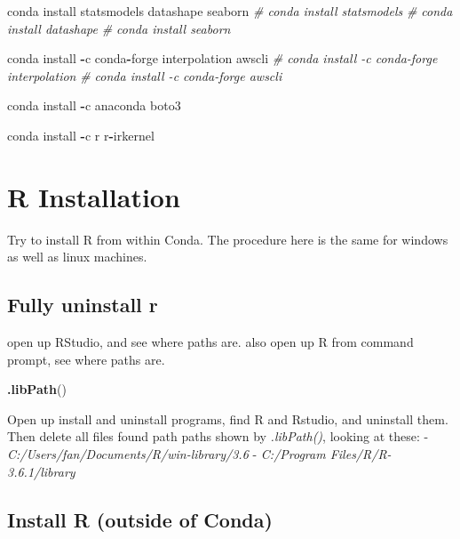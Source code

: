\documentclass[
]{article}
\newenvironment{Shaded}{\begin{snugshade}}{\end{snugshade}}
\newcommand{\CommentTok}[1]{\textcolor[rgb]{0.56,0.35,0.01}{\textit{#1}}}
\newcommand{\KeywordTok}[1]{\textcolor[rgb]{0.13,0.29,0.53}{\textbf{#1}}}
\newcommand{\NormalTok}[1]{#1}
\newcommand{\OperatorTok}[1]{\textcolor[rgb]{0.81,0.36,0.00}{\textbf{#1}}}
\begin{document}
\begin{Shaded}
\begin{Highlighting}[]
\NormalTok{conda install statsmodels datashape seaborn}
\CommentTok{# conda install statsmodels}
\CommentTok{# conda install datashape}
\CommentTok{# conda install seaborn}

\NormalTok{conda install }\OperatorTok{-}\NormalTok{c conda}\OperatorTok{-}\NormalTok{forge interpolation awscli}
\CommentTok{# conda install -c conda-forge interpolation}
\CommentTok{# conda install -c conda-forge awscli}

\NormalTok{conda install }\OperatorTok{-}\NormalTok{c anaconda boto3}

\NormalTok{conda install }\OperatorTok{-}\NormalTok{c r r}\OperatorTok{-}\NormalTok{irkernel}
\end{Highlighting}
\end{Shaded}

\hypertarget{r-installation}{%
\section{R Installation}\label{r-installation}}

Try to install R from within Conda. The procedure here is the same for
windows as well as linux machines.

\hypertarget{fully-uninstall-r}{%
\subsection{Fully uninstall r}\label{fully-uninstall-r}}

open up RStudio, and see where paths are. also open up R from command
prompt, see where paths are.

\begin{Shaded}
\begin{Highlighting}[]
\KeywordTok{.libPath}\NormalTok{()}
\end{Highlighting}
\end{Shaded}

Open up install and uninstall programs, find R and Rstudio, and
uninstall them. Then delete all files found path paths shown by
\emph{.libPath()}, looking at these: -
\emph{C:/Users/fan/Documents/R/win-library/3.6} - \emph{C:/Program
Files/R/R-3.6.1/library}

\hypertarget{install-r-outside-of-conda}{%
\subsection{Install R (outside of
Conda)}\label{install-r-outside-of-conda}}
\end{document}
